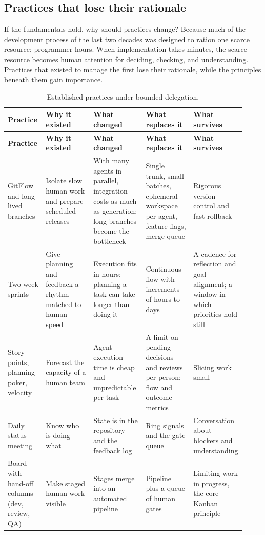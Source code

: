 \documentclass[11pt]{article}
\begin{document}
\subsection{Practices that lose their rationale}

If the fundamentals hold, why should practices change? Because much of the development process of the last two decades was designed to ration one scarce resource: programmer hours. When implementation takes minutes, the scarce resource becomes human attention for deciding, checking, and understanding. Practices that existed to manage the first lose their rationale, while the principles beneath them gain importance.

\small
\begin{longtable}{p{0.16\linewidth}p{0.2\linewidth}p{0.22\linewidth}p{0.2\linewidth}p{0.14\linewidth}}
\caption{Established practices under bounded delegation.}\\
\toprule
\textbf{Practice} & \textbf{Why it existed} & \textbf{What changed} & \textbf{What replaces it} & \textbf{What survives} \\
\midrule
\endfirsthead
\toprule
\textbf{Practice} & \textbf{Why it existed} & \textbf{What changed} & \textbf{What replaces it} & \textbf{What survives} \\
\midrule
\endhead
GitFlow and long-lived branches & Isolate slow human work and prepare scheduled releases & With many agents in parallel, integration costs as much as generation; long branches become the bottleneck & Single trunk, small batches, ephemeral workspace per agent, feature flags, merge queue & Rigorous version control and fast rollback \\
Two-week sprints & Give planning and feedback a rhythm matched to human speed & Execution fits in hours; planning a task can take longer than doing it & Continuous flow with increments of hours to days & A cadence for reflection and goal alignment; a window in which priorities hold still \\
Story points, planning poker, velocity & Forecast the capacity of a human team & Agent execution time is cheap and unpredictable per task & A limit on pending decisions and reviews per person; flow and outcome metrics & Slicing work small \\
Daily status meeting & Know who is doing what & State is in the repository and the feedback log & Ring signals and the gate queue & Conversation about blockers and understanding \\
Board with hand-off columns (dev, review, QA) & Make staged human work visible & Stages merge into an automated pipeline & Pipeline plus a queue of human gates & Limiting work in progress, the core Kanban principle \\

\end{longtable}
\end{document}
